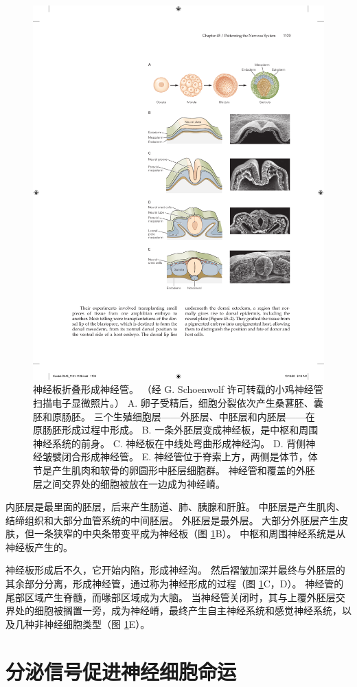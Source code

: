 \begin{figure}[htbp]
	\centering
	\includegraphics[width=0.65\linewidth]{chap45/fig_45_1}
	\caption{神经板折叠形成神经管。 （经 G. Schoenwolf 许可转载的小鸡神经管扫描电子显微照片。） A. 卵子受精后，细胞分裂依次产生桑葚胚、囊胚和原肠胚。 三个生殖细胞层——外胚层、中胚层和内胚层——在原肠胚形成过程中形成。 B. 一条外胚层变成神经板，是中枢和周围神经系统的前身。 C. 神经板在中线处弯曲形成神经沟。 D. 背侧神经皱襞闭合形成神经管。 E. 神经管位于脊索上方，两侧是体节，体节是产生肌肉和软骨的卵圆形中胚层细胞群。 神经管和覆盖的外胚层之间交界处的细胞被放在一边成为神经嵴。}
	\label{fig:45_1}
\end{figure}


内胚层是最里面的胚层，后来产生肠道、肺、胰腺和肝脏。
中胚层是产生肌肉、结缔组织和大部分血管系统的中间胚层。
外胚层是最外层。
大部分外胚层产生皮肤，但一条狭窄的中央条带变平成为神经板（图 \ref{fig:45_1}B）。
中枢和周围神经系统是从神经板产生的。


神经板形成后不久，它开始内陷，形成神经沟。
然后褶皱加深并最终与外胚层的其余部分分离，形成神经管，通过称为神经形成的过程（图 \ref{fig:45_1}C，D）。
神经管的尾部区域产生脊髓，而喙部区域成为大脑。
当神经管关闭时，其与上覆外胚层交界处的细胞被搁置一旁，成为神经嵴，最终产生自主神经系统和感觉神经系统，以及几种非神经细胞类型（图 \ref{fig:45_1}E）。



\section{分泌信号促进神经细胞命运}

